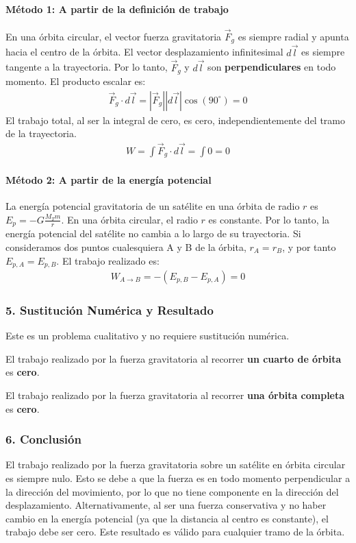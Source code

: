 \paragraph*{Método 1: A partir de la definición de trabajo}
En una órbita circular, el vector fuerza gravitatoria $\vec{F}_g$ es siempre radial y apunta hacia el centro de la órbita. El vector desplazamiento infinitesimal $d\vec{l}$ es siempre tangente a la trayectoria. Por lo tanto, $\vec{F}_g$ y $d\vec{l}$ son \textbf{perpendiculares} en todo momento. El producto escalar es:
\begin{gather}
    \vec{F}_g \cdot d\vec{l} = |\vec{F}_g| |d\vec{l}| \cos(90^\circ) = 0
\end{gather}
El trabajo total, al ser la integral de cero, es cero, independientemente del tramo de la trayectoria.
\begin{gather}
    W = \int \vec{F}_g \cdot d\vec{l} = \int 0 = 0
\end{gather}
\paragraph*{Método 2: A partir de la energía potencial}
La energía potencial gravitatoria de un satélite en una órbita de radio $r$ es $E_p = -G \frac{M_T m}{r}$. En una órbita circular, el radio $r$ es constante. Por lo tanto, la energía potencial del satélite no cambia a lo largo de su trayectoria. Si consideramos dos puntos cualesquiera A y B de la órbita, $r_A = r_B$, y por tanto $E_{p,A} = E_{p,B}$.
El trabajo realizado es:
\begin{gather}
    W_{A \to B} = -(E_{p,B} - E_{p,A}) = 0
\end{gather}

\subsubsection*{5. Sustitución Numérica y Resultado}
Este es un problema cualitativo y no requiere sustitución numérica.
\begin{cajaresultado}
    El trabajo realizado por la fuerza gravitatoria al recorrer \textbf{un cuarto de órbita} es \textbf{cero}.
\end{cajaresultado}
\begin{cajaresultado}
    El trabajo realizado por la fuerza gravitatoria al recorrer \textbf{una órbita completa} es \textbf{cero}.
\end{cajaresultado}

\subsubsection*{6. Conclusión}
\begin{cajaconclusion}
El trabajo realizado por la fuerza gravitatoria sobre un satélite en órbita circular es siempre nulo. Esto se debe a que la fuerza es en todo momento perpendicular a la dirección del movimiento, por lo que no tiene componente en la dirección del desplazamiento. Alternativamente, al ser una fuerza conservativa y no haber cambio en la energía potencial (ya que la distancia al centro es constante), el trabajo debe ser cero. Este resultado es válido para cualquier tramo de la órbita.
\end{cajaconclusion}


